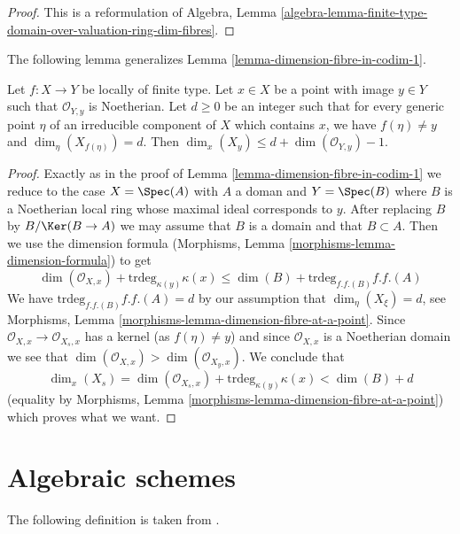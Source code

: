 \begin{proof}
This is a reformulation of Algebra, Lemma
\ref{algebra-lemma-finite-type-domain-over-valuation-ring-dim-fibres}.
\end{proof}

\noindent
The following lemma generalizes Lemma \ref{lemma-dimension-fibre-in-codim-1}.

\begin{lemma}
\label{lemma-dimension-fibre-in-higher-codimension}
Let $f : X \to Y$ be locally of finite type. Let $x \in X$ be a point
with image $y \in Y$ such that $\mathcal{O}_{Y, y}$ is Noetherian. Let
$d \geq 0$ be an integer such that for every generic point $\eta$ of an
irreducible component of $X$ which contains $x$, we have
$f(\eta) \not = y$ and $\dim_\eta(X_{f(\eta)}) = d$. Then
$\dim_x(X_y) \leq d + \dim(\mathcal{O}_{Y, y}) - 1$.
\end{lemma}

\begin{proof}
Exactly as in the proof of Lemma \ref{lemma-dimension-fibre-in-codim-1}
we reduce to the case $X = \Spec(A)$ with $A$ a doman and $Y = \Spec(B)$
where $B$ is a Noetherian local ring whose maximal ideal corresponds to $y$.
After replacing $B$ by $B/\Ker(B \to A)$ we may assume that $B$
is a domain and that $B \subset A$.
Then we use the dimension formula
(Morphisms, Lemma \ref{morphisms-lemma-dimension-formula}) to get
$$
\dim(\mathcal{O}_{X, x}) + \text{trdeg}_{\kappa(y)} \kappa(x) \leq
\dim(B) + \text{trdeg}_{f.f.(B)} f.f.(A)
$$
We have $\text{trdeg}_{f.f.(B)} f.f.(A) = d$ by
our assumption that $\dim_\eta(X_\xi) = d$, see
Morphisms, Lemma \ref{morphisms-lemma-dimension-fibre-at-a-point}.
Since $\mathcal{O}_{X, x} \to \mathcal{O}_{X_s, x}$ has a kernel
(as $f(\eta) \not = y$) and since $\mathcal{O}_{X, x}$
is a Noetherian domain we see that
$\dim(\mathcal{O}_{X, x}) > \dim(\mathcal{O}_{X_y, x})$.
We conclude that
$$
\dim_x(X_s) =
\dim(\mathcal{O}_{X_s, x}) + \text{trdeg}_{\kappa(y)} \kappa(x)
< \dim(B) + d
$$
(equality by Morphisms, Lemma \ref{morphisms-lemma-dimension-fibre-at-a-point})
which proves what we want.
\end{proof}




\section{Algebraic schemes}
\label{section-algebraic-schemes}

\noindent
The following definition is taken from
\cite[I Definition 6.4.1]{EGA}.

